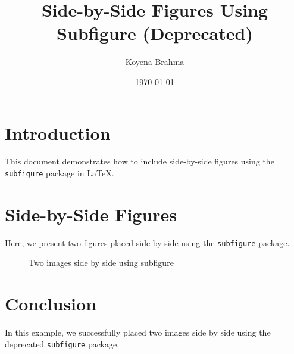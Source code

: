 \documentclass{article}
\begin{document}
\title{Side-by-Side Figures Using Subfigure (Deprecated)}
\author{Koyena Brahma}
\date{\today}
\maketitle

\section{Introduction}
This document demonstrates how to include side-by-side figures using the \texttt{subfigure} package in LaTeX.

\section{Side-by-Side Figures}

Here, we present two figures placed side by side using the \texttt{subfigure} package.

\begin{figure}[h]
    \centering
    \hfill
    \caption{Two images side by side using subfigure}
    \label{fig:side_by_side_subfigure}
\end{figure}

\section{Conclusion}
In this example, we successfully placed two images side by side using the deprecated \texttt{subfigure} package.
\end{document}
